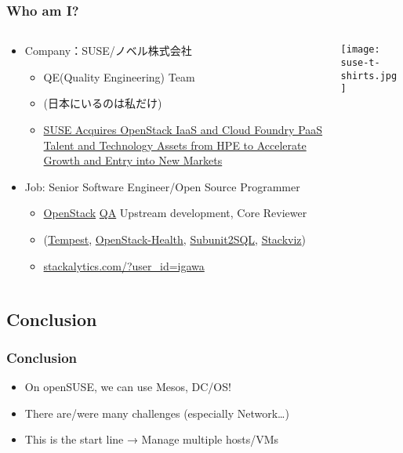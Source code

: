 \documentclass[aspectratio=169,11pt,hyperref={colorlinks=true}]{beamer}
\begin{document}
\begin{frame}
  \frametitle{Who am I?}
  \begin{columns}[T]
    \begin{column}{.5\textwidth}
      \begin{itemize}
        \item Company：SUSE/ノベル株式会社
          \begin{itemize}
            \item QE(Quality Engineering) Team
            \item[] (日本にいるのは私だけ)
            \item \href{https://www.suse.com/newsroom/post/2016/suse-acquires-openstack-iaas-and-cloud-foundry-paas-talent-and-technology-assets-from-hpe-to-accelerate-growth-and-entry-into-new-markets/}{SUSE Acquires OpenStack IaaS and Cloud Foundry PaaS Talent and Technology Assets from HPE to Accelerate Growth and Entry into New Markets}
          \end{itemize}
        \item Job: Senior Software Engineer/Open Source Programmer
          \begin{itemize}
            \item \href{https://www.openstack.org/}{OpenStack}
             \href{https://wiki.openstack.org/wiki/QA}{QA} Upstream development, Core Reviewer
            \item[] (\href{https://docs.openstack.org/developer/tempest/}{Tempest},
             \href{http://status.openstack.org/openstack-health/}{OpenStack-Health},
             \href{https://docs.openstack.org/developer/subunit2sql/}{Subunit2SQL},
             \href{https://docs.openstack.org/developer/stackviz/}{Stackviz})
            \item \href{http://stackalytics.com/?user_id=igawa&release=all&metric=all}{stackalytics.com/?user\_id=igawa}
          \end{itemize}
      \end{itemize}
    \end{column}
    \begin{column}{.5\textwidth}
      \begin{center}
        \texttt{[image: suse-t-shirts.jpg]}
      \end{center}
    \end{column}
  \end{columns}
\end{frame}


\subsection{Conclusion}
\begin{frame}
\frametitle{Conclusion}
  \begin{itemize}
    \item On openSUSE, we can use Mesos, DC/OS!
    \item There are/were many challenges (especially Network\ldots)
    \item This is the start line → Manage multiple hosts/VMs
  \end{itemize}
\end{frame}
\end{document}
